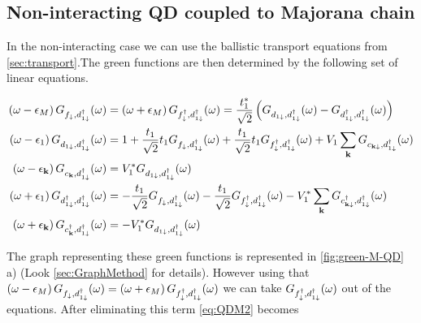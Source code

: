 \subsection{Non-interacting QD coupled to  Majorana chain \label{sec:GreenMaj-DQD}}

In the non-interacting case we can use the ballistic transport equations from \ref{sec:transport}.The green functions are then determined by the following set of linear equations. 




\begin{align}
    \left(\omega-\epsilon_{M}\right)G_{f_{\downarrow},d_{1\downarrow}^{\dagger}}(\omega)&=\left(\omega+\epsilon_{M}\right)G_{f_{\downarrow}^{\dagger},d_{1\downarrow}^{\dagger}}(\omega)=\frac{t^*_1}{\sqrt{2}}\left(G_{d_{1\downarrow},d_{1\downarrow}^{\dagger}}(\omega)-G_{d_{1\downarrow}^{\dagger},d_{1\downarrow}^{\dagger}}(\omega)\right) \label{eq:QDM1} \\ 
    \left(\omega-\epsilon_{1}\right)G_{d_{1\downarrow},d_{1\downarrow}^{\dagger}}(\omega)&=1+\frac{t_1}{\sqrt{2}}t_{1}G_{f_{\downarrow},d_{1\downarrow}^{\dagger}}(\omega)+\frac{t_1}{\sqrt{2}}t_{1}G_{f_{\downarrow}^{\dagger},d_{1\downarrow}^{\dagger}}(\omega)+V_{1}\sum_{\mathbf{k}}G_{c_{\mathbf{k\downarrow}},d_{1\downarrow}^{\dagger}}(\omega) \label{eq:QDM2} \\ 
    \left(\omega-\epsilon_{\mathbf{k}}\right)G_{c_{\mathbf{k}},d_{1\downarrow}^{\dagger}}(\omega)&=V_{1}^{*}G_{d_{1\downarrow},d_{1\downarrow}^{\dagger}}(\omega)\label{eq:QDM3} \\
    \left(\omega+\epsilon_{1}\right)G_{d_{1\downarrow}^{\dagger},d_{1\downarrow}^{\dagger}}(\omega)&=-\frac{t_1}{\sqrt{2}}G_{f_{\downarrow},d_{1\downarrow}^{\dagger}}(\omega)-\frac{t_1}{\sqrt{2}}G_{f_{\downarrow}^{\dagger},d_{1\downarrow}^{\dagger}}(\omega)-V_{1}^{*}\sum_{\mathbf{k}}G_{c_{\mathbf{k\downarrow}}^{\dagger},d_{1\downarrow}^{\dagger}}(\omega) \label{eq:QDM4} \\
    \left(\omega+\epsilon_{\mathbf{k}}\right)G_{c^\dagger_{\mathbf{k}},d_{1\downarrow}^{\dagger}}(\omega)&=-V_{1}^{*}G_{d_{1\downarrow},d_{1\downarrow}^{\dagger}}(\omega) \label{eq:QDM5}
\end{align}

The graph representing these green functions is represented in \ref{fig:green-M-QD} a)  (Look \ref{sec:GraphMethod} for details). However using that $\left(\omega-\epsilon_{M}\right)G_{f_{\downarrow},d_{1\downarrow}^{\dagger}}(\omega)=\left(\omega+\epsilon_{M}\right)G_{f_{\downarrow}^{\dagger},d_{1\downarrow}^{\dagger}}(\omega)$ we can take
 $G_{f_{\downarrow}^{\dagger},d_{1\downarrow}^{\dagger}}(\omega)$ out of the equations. After eliminating this term \ref{eq:QDM2} becomes
 
